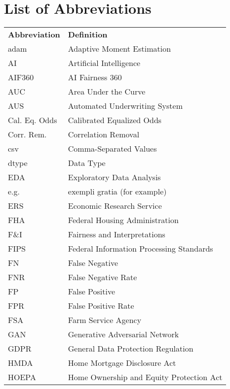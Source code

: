 \documentclass[
	12pt, 
	a4paper, 
	oneside,
	parskip=half*, %
	openany,  %
	listof=totoc, %
	bibliography=totoc, %
	index=totoc, %
  toc=chapterentrywithdots, %
  numbers=noenddot, %
]{scrbook}
\begin{document}



\cleardoubleoddpage	
{} %
\chapter*{List of Abbreviations}

\setlength{\LTleft}{-0.45em}  %

\begin{longtable}{ll}
\large\textbf{Abbreviation} & \large\textbf{Definition} \\
adam & Adaptive Moment Estimation \\
AI & Artificial Intelligence \\
AIF360 & AI Fairness 360 \\
AUC & Area Under the Curve \\
AUS & Automated Underwriting System \\
Cal. Eq. Odds & Calibrated Equalized Odds \\
Corr. Rem. & Correlation Removal \\
csv & Comma-Separated Values \\
dtype & Data Type \\
EDA & Exploratory Data Analysis \\
e.g. & exempli gratia (for example) \\
ERS & Economic Research Service \\
FHA & Federal Housing Administration \\
F\&I & Fairness and Interpretations \\
FIPS & Federal Information Processing Standards \\
FN & False Negative \\
FNR & False Negative Rate \\
FP & False Positive \\
FPR & False Positive Rate \\
FSA & Farm Service Agency \\
GAN & Generative Adversarial Network \\
GDPR & General Data Protection Regulation \\
HMDA & Home Mortgage Disclosure Act \\
HOEPA & Home Ownership and Equity Protection Act \\

\end{longtable}
\end{document}
